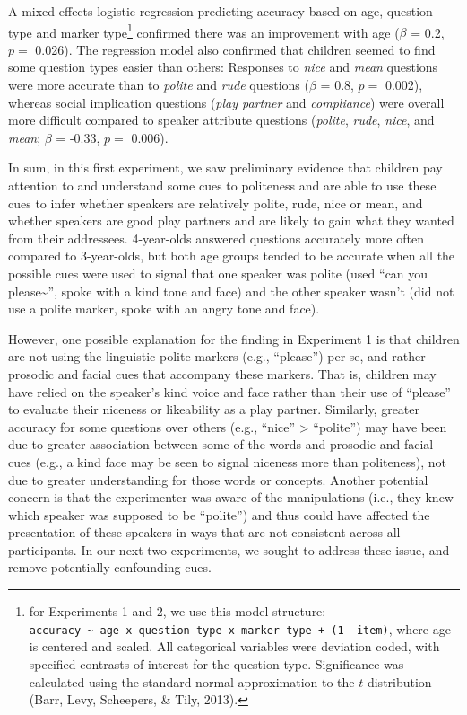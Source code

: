 \documentclass[10pt, letterpaper]{article}
\begin{document}
A mixed-effects logistic regression predicting accuracy based on age,
question type and marker type\footnote{for Experiments 1 and 2, we use
  this model structure:
  \texttt{accuracy\ \textasciitilde{}\ age\ x\ question\ type\ x\ marker\ type\ +\ (1\ \textbar{}\ item)},
  where age is centered and scaled. All categorical variables were
  deviation coded, with specified contrasts of interest for the question
  type. Significance was calculated using the standard normal
  approximation to the \(t\) distribution (Barr, Levy, Scheepers, \&
  Tily, 2013).} confirmed there was an improvement with age (\(\beta\) =
0.2, \(p =\) 0.026). The regression model also confirmed that children
seemed to find some question types easier than others: Responses to
\emph{nice} and \emph{mean} questions were more accurate than to
\emph{polite} and \emph{rude} questions (\(\beta\) = 0.8, \(p =\)
0.002), whereas social implication questions (\emph{play partner} and
\emph{compliance}) were overall more difficult compared to speaker
attribute questions (\emph{polite}, \emph{rude}, \emph{nice}, and
\emph{mean}; \(\beta\) = -0.33, \(p =\) 0.006).

In sum, in this first experiment, we saw preliminary evidence that
children pay attention to and understand some cues to politeness and are
able to use these cues to infer whether speakers are relatively polite,
rude, nice or mean, and whether speakers are good play partners and are
likely to gain what they wanted from their addressees. 4-year-olds
answered questions accurately more often compared to 3-year-olds, but
both age groups tended to be accurate when all the possible cues were
used to signal that one speaker was polite (used ``can you
please\textasciitilde{}'', spoke with a kind tone and face) and the
other speaker wasn't (did not use a polite marker, spoke with an angry
tone and face).

However, one possible explanation for the finding in Experiment 1 is
that children are not using the linguistic polite markers (e.g.,
``please'') per se, and rather prosodic and facial cues that accompany
these markers. That is, children may have relied on the speaker's kind
voice and face rather than their use of ``please'' to evaluate their
niceness or likeability as a play partner. Similarly, greater accuracy
for some questions over others (e.g., ``nice'' \textgreater{}
``polite'') may have been due to greater association between some of the
words and prosodic and facial cues (e.g., a kind face may be seen to
signal niceness more than politeness), not due to greater understanding
for those words or concepts. Another potential concern is that the
experimenter was aware of the manipulations (i.e., they knew which
speaker was supposed to be ``polite'') and thus could have affected the
presentation of these speakers in ways that are not consistent across
all participants. In our next two experiments, we sought to address
these issue, and remove potentially confounding cues.
\end{document}
